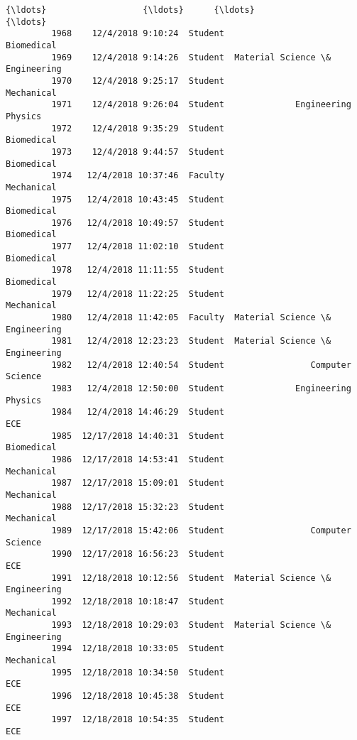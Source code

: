 \documentclass[11pt]{article}
\begin{document}
\begin{Verbatim}[commandchars=\\\{\}]
         {\ldots}                   {\ldots}      {\ldots}                              {\ldots}   
         1968    12/4/2018 9:10:24  Student                       Biomedical   
         1969    12/4/2018 9:14:26  Student  Material Science \&  Engineering   
         1970    12/4/2018 9:25:17  Student                       Mechanical   
         1971    12/4/2018 9:26:04  Student              Engineering Physics   
         1972    12/4/2018 9:35:29  Student                       Biomedical   
         1973    12/4/2018 9:44:57  Student                       Biomedical   
         1974   12/4/2018 10:37:46  Faculty                       Mechanical   
         1975   12/4/2018 10:43:45  Student                       Biomedical   
         1976   12/4/2018 10:49:57  Student                       Biomedical   
         1977   12/4/2018 11:02:10  Student                       Biomedical   
         1978   12/4/2018 11:11:55  Student                       Biomedical   
         1979   12/4/2018 11:22:25  Student                       Mechanical   
         1980   12/4/2018 11:42:05  Faculty  Material Science \&  Engineering   
         1981   12/4/2018 12:23:23  Student  Material Science \&  Engineering   
         1982   12/4/2018 12:40:54  Student                 Computer Science   
         1983   12/4/2018 12:50:00  Student              Engineering Physics   
         1984   12/4/2018 14:46:29  Student                              ECE   
         1985  12/17/2018 14:40:31  Student                       Biomedical   
         1986  12/17/2018 14:53:41  Student                       Mechanical   
         1987  12/17/2018 15:09:01  Student                       Mechanical   
         1988  12/17/2018 15:32:23  Student                       Mechanical   
         1989  12/17/2018 15:42:06  Student                 Computer Science   
         1990  12/17/2018 16:56:23  Student                              ECE   
         1991  12/18/2018 10:12:56  Student  Material Science \&  Engineering   
         1992  12/18/2018 10:18:47  Student                       Mechanical   
         1993  12/18/2018 10:29:03  Student  Material Science \&  Engineering   
         1994  12/18/2018 10:33:05  Student                       Mechanical   
         1995  12/18/2018 10:34:50  Student                              ECE   
         1996  12/18/2018 10:45:38  Student                              ECE   
         1997  12/18/2018 10:54:35  Student                              ECE   
         

\end{Verbatim}
\end{document}
